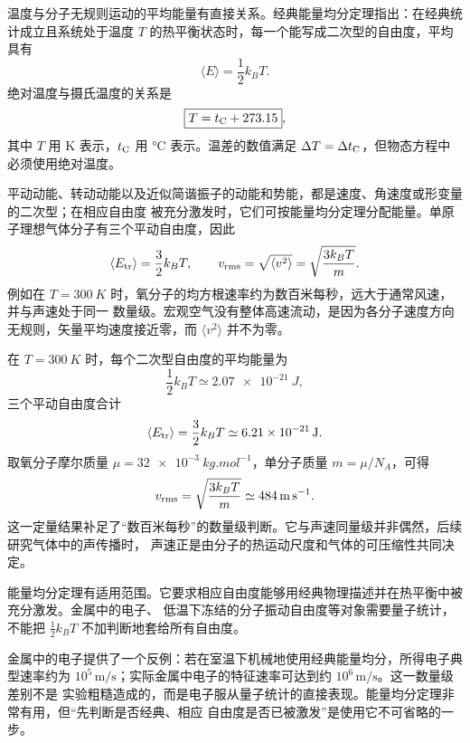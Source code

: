 温度与分子无规则运动的平均能量有直接关系。经典能量均分定理指出：在经典统计成立且系统处于温度
$T$ 的热平衡状态时，每一个能写成二次型的自由度，平均具有
\begin{equation}
  \boxed{\langle E\rangle=\frac12k_BT}.
\end{equation}
绝对温度与摄氏温度的关系是
\begin{equation}
  \boxed{T=t_{\rm C}+273.15},
\end{equation}
其中 $T$ 用 K 表示，$t_{\rm C}$ 用 $\si{\degreeCelsius}$ 表示。温差的数值满足
$\Delta T=\Delta t_{\rm C}$，但物态方程中必须使用绝对温度。

平动动能、转动动能以及近似简谐振子的动能和势能，都是速度、角速度或形变量的二次型；在相应自由度
被充分激发时，它们可按能量均分定理分配能量。单原子理想气体分子有三个平动自由度，因此
\begin{equation}
  \left\langle E_{\rm tr}\right\rangle=\frac32k_BT,
  \qquad
  v_{\rm rms}=\sqrt{\langle v^2\rangle}=\sqrt{\frac{3k_BT}{m}}.
\end{equation}
例如在 $T=\SI{300}{K}$ 时，氧分子的均方根速率约为数百米每秒，远大于通常风速，并与声速处于同一
数量级。宏观空气没有整体高速流动，是因为各分子速度方向无规则，矢量平均速度接近零，而
$\langle v^2\rangle$ 并不为零。

在 $T=\SI{300}{K}$ 时，每个二次型自由度的平均能量为
\begin{equation}
  \frac12k_BT\simeq\SI{2.07e-21}{J},
\end{equation}
三个平动自由度合计
\begin{equation}
  \left\langle E_{\rm tr}\right\rangle
  =\frac32k_BT\simeq\SI{6.21e-21}{J}.
\end{equation}
取氧分子摩尔质量 $\mu=\SI{32e-3}{kg.mol^{-1}}$，单分子质量 $m=\mu/N_A$，可得
\begin{equation}
  v_{\rm rms}=\sqrt{\frac{3k_BT}{m}}\simeq\SI{484}{m.s^{-1}}.
\end{equation}
这一定量结果补足了“数百米每秒”的数量级判断。它与声速同量级并非偶然，后续研究气体中的声传播时，
声速正是由分子的热运动尺度和气体的可压缩性共同决定。

能量均分定理有适用范围。它要求相应自由度能够用经典物理描述并在热平衡中被充分激发。金属中的电子、
低温下冻结的分子振动自由度等对象需要量子统计，不能把 $\tfrac12k_BT$ 不加判断地套给所有自由度。

金属中的电子提供了一个反例：若在室温下机械地使用经典能量均分，所得电子典型速率约为
$10^5\,\mathrm{m/s}$；实际金属中电子的特征速率可达到约 $10^6\,\mathrm{m/s}$。这一数量级差别不是
实验粗糙造成的，而是电子服从量子统计的直接表现。能量均分定理非常有用，但“先判断是否经典、相应
自由度是否已被激发”是使用它不可省略的一步。

